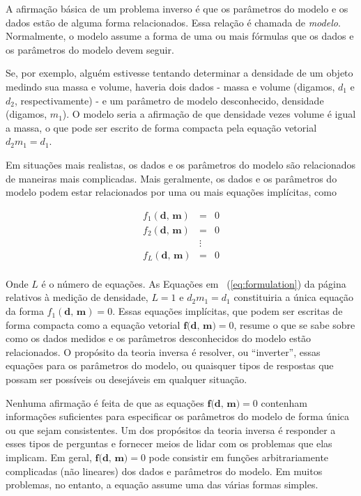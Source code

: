\documentclass[a4paper, 12 pt]{article} %
\begin{document}
A afirmação básica de um problema inverso é que os parâmetros do modelo e os dados estão de alguma forma relacionados. Essa relação é chamada de \textit{modelo}. Normalmente, o modelo assume a forma de uma ou mais fórmulas que os dados e os parâmetros do modelo devem seguir.

Se, por exemplo, alguém estivesse tentando determinar a densidade de um objeto medindo sua massa e volume, haveria dois dados - massa e volume (digamos, $d_{1}$ e $d_{2}$, respectivamente) - e um parâmetro de modelo desconhecido, densidade (digamos, $m_{1}$). O modelo seria a afirmação de que densidade vezes volume é igual a massa, o que pode ser escrito de forma compacta pela equação vetorial $d_{2}m_{1} = d_{1}$.

Em situações mais realistas, os dados e os parâmetros do modelo são relacionados de maneiras mais complicadas. Mais geralmente, os dados e os parâmetros do modelo podem estar relacionados por uma ou mais equações implícitas, como

\begin{equation}\label{eq:formulation}
\begin{matrix}
f_{1}(\textbf{d, m}) &=& 0 \\
f_{2}(\textbf{d, m}) &=& 0 \\
&\vdots \\
f_{L}(\textbf{d, m}) &=& 0 \\
\end{matrix}
\end{equation}

Onde $L$ é o número de equações. As Equações em  ~(\ref{eq:formulation}) da página~\pageref{eq:formulation} relativos à medição de densidade, $L = 1$ e $d_{2}m_{1} = d_{1}$ constituiria a única equação da forma $f_{1}(\textbf{d, m}) = 0$. Essas equações implícitas, que podem ser escritas de forma compacta como a equação vetorial $\textbf{f(d, m)} = 0$, resume o que se sabe sobre como os dados medidos e os parâmetros desconhecidos do modelo estão relacionados. O propósito da teoria inversa é resolver, ou ``inverter'', essas equações para os parâmetros do modelo, ou quaisquer tipos de respostas que possam ser possíveis ou desejáveis em qualquer situação.

Nenhuma afirmação é feita de que as equações $\textbf{f(d, m)} = 0$ contenham informações suficientes para especificar os parâmetros do modelo de forma única ou que sejam consistentes. Um dos propósitos da teoria inversa é responder a esses tipos de perguntas e fornecer meios de lidar com os problemas que elas implicam. Em geral, $\textbf{f(d, m)} = 0$ pode consistir em funções arbitrariamente complicadas (não lineares) dos dados e parâmetros do modelo. Em muitos problemas, no entanto, a equação assume uma das várias formas simples.
\end{document}

